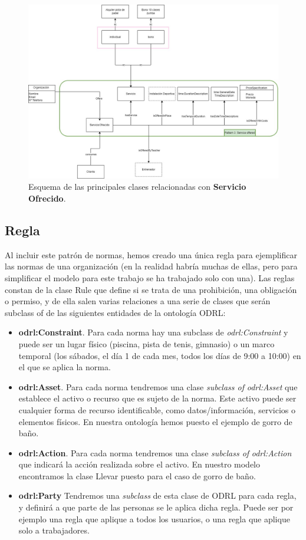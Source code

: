 \documentclass[a4paper,12pt]{article}
\begin{document}
	\begin{figure}[H]
		\centering
		\includegraphics[width=\textwidth]{include/pattern.jpg}
		\caption{Esquema de las principales clases relacionadas con \textbf{Servicio Ofrecido}.}
	\end{figure}
	
	\subsection{Regla}
	
	Al incluir este patrón de normas, hemos creado una única regla para ejemplificar las normas de
	una organización (en la realidad habría muchas de ellas, pero para simplificar el modelo para este
	trabajo se ha trabajado solo con una). Las reglas constan de la clase Rule que define si se trata de
	una prohibición, una obligación o permiso, y de ella salen varias relaciones a una serie de clases
	que serán subclass of de las siguientes entidades de la ontología ODRL:
	
	\begin{itemize}
		\item \textbf{odrl:Constraint}. Para cada norma hay una subclass de \textit{odrl:Constraint} y puede ser un
lugar físico (piscina, pista de tenis, gimnasio) o un marco temporal (los sábados, el día 1
de cada mes, todos los días de 9:00 a 10:00) en el que se aplica la norma.
		\item \textbf{odrl:Asset}. Para cada norma tendremos una clase \textit{subclass of} \textit{odrl:Asset} que establece el
activo o recurso que es sujeto de la norma. Este activo puede ser cualquier forma de
recurso identificable, como datos/información, servicios o elementos físicos. En nuestra
ontología hemos puesto el ejemplo de gorro de baño.
		\item \textbf{odrl:Action}. Para cada norma tendremos una clase \textit{subclass of} \textit{odrl:Action} que indicará
la acción realizada sobre el activo. En nuestro modelo encontramos la clase Llevar puesto
para el caso de gorro de baño.
		\item \textbf{odrl:Party} Tendremos una \textit{subclass} de esta clase de ODRL para cada regla, y definirá a
que parte de las personas se le aplica dicha regla. Puede ser por ejemplo una regla que
aplique a todos los usuarios, o una regla que aplique solo a trabajadores.
	\end{itemize}
	
\end{document}
